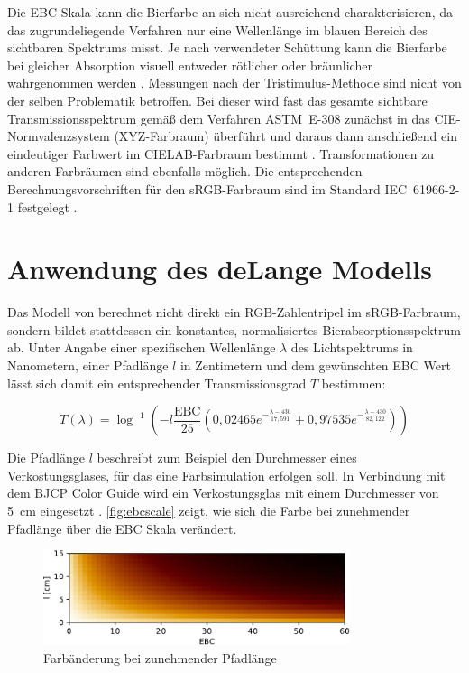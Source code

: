 \documentclass[10pt,a4paper,DIV=12,parskip=half]{scrarticle}
\begin{document}
Die EBC Skala kann die Bierfarbe an sich nicht ausreichend charakterisieren, da das zugrundeliegende Verfahren nur eine Wellenlänge im blauen Bereich des sichtbaren Spektrums misst. Je nach verwendeter Schüttung kann die Bierfarbe bei gleicher Absorption visuell entweder rötlicher oder bräunlicher wahrgenommen werden \autocite{Tucker2017}. Messungen nach der Tristimulus-Methode sind nicht von der selben Problematik betroffen. Bei dieser wird fast das gesamte sichtbare Transmissionsspektrum gemäß dem Verfahren ASTM~E-308 zunächst in das CIE-Normvalenzsystem (XYZ-Farbraum) überführt und daraus dann anschließend ein eindeutiger Farbwert im CIELAB-Farbraum bestimmt \autocites{deLange2016}{ASBC2011}. Transformationen zu anderen Farbräumen sind ebenfalls möglich. Die entsprechenden Berechnungsvorschriften für den sRGB-Farbraum sind im Standard IEC~61966-2-1 festgelegt \autocite{W3C2015}.

\section*{Anwendung des deLange Modells}

Das Modell von \textcite{deLange2016} berechnet nicht direkt ein RGB-Zahlentripel im sRGB-Farbraum, sondern bildet stattdessen ein konstantes, normalisiertes Bierabsorptionsspektrum ab. Unter Angabe einer spezifischen Wellenlänge $\lambda$ des Lichtspektrums in Nanometern, einer Pfadlänge $l$ in Zentimetern und dem gewünschten EBC Wert lässt sich damit ein entsprechender Transmissionsgrad $T$ bestimmen:

\begin{equation*}
T(\lambda)=\log^{-1}\left(-l \frac{\text{EBC}}{25} \left(0,02465e^{-\frac{\lambda-430}{17,591}}+0,97535e^{-\frac{\lambda-430}{82,122}}\right)\right)
\end{equation*}

Die Pfadlänge $l$ beschreibt zum Beispiel den Durchmesser eines Verkostungsglases, für das eine Farbsimulation erfolgen soll. In Verbindung mit dem BJCP Color Guide wird ein Verkostungsglas mit einem Durchmesser von 5~cm eingesetzt \autocite{BJCP}. \autoref{fig:ebcscale} zeigt, wie sich die Farbe bei zunehmender Pfadlänge über die EBC Skala verändert.

\begin{figure}[H]
	\centering
	\includegraphics[width=9cm]{ebc_scale.pdf}
	\caption{Farbänderung bei zunehmender Pfadlänge}
	\label{fig:ebcscale}
\end{figure}
\end{document}
